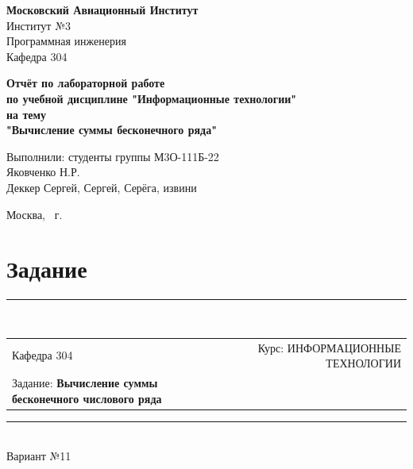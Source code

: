 \documentclass[a4paper]{article}
\begin{document}
	\def\contentsname{Содержание}
	
	\begin{titlepage}
		\begin{center}
			\textbf{Московский Авиационный Институт\\[10mm]}
				Институт №3 \\
				Программная инженерия \\
				Кафедра 304 \\
			
			\vfill
			
			\textbf{Отчёт по лабораторной работе \\ 
				по учебной дисциплине "Информационные технологии" \\
				на тему \\
				"Вычисление суммы бесконечного ряда" \\ [50mm]
			}
		\end{center}
		
		\hfill
		\begin{minipage}{.5\textwidth}
			Выполнили: студенты группы М3О-111Б-22 \\ [2mm] 
			Яковченко Н.Р. \\
			Деккер Сергей, Сергей, Серёга, извини \\
		\end{minipage}%
		\vfill
		\begin{center}
			Москва, \the\year\ г.
		\end{center}
	\end{titlepage}
	
	\tableofcontents
	\newpage
	
	\section{Задание}
	
	\begin{center}
	\rule{\textwidth}{1pt} \\[2mm]
		\begin{tabular}{ lllll }
			\multicolumn{1}{l}{Кафедра 304} & \multicolumn{4}{r}{Курс: ИНФОРМАЦИОННЫЕ ТЕХНОЛОГИИ} \\[2mm]
			\multicolumn{3}{l}{Задание: \textbf{Вычисление суммы бесконечного числового ряда}} & & \\[2mm]
		\end{tabular}
	\rule{\textwidth}{1pt} \\[2mm]
	Вариант №11
	\end{center}
	
\end{document}

